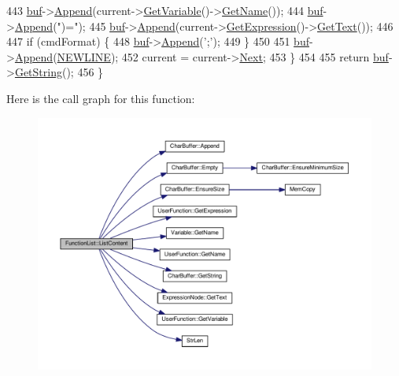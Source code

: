 \begin{DoxyCode}
443         \hyperlink{classFunctionList_aa69c3feda1c4a6133fe821982b418c39}{buf}->\hyperlink{classCharBuffer_a045b38735f7b3007c1b98d3d7b7feafe}{Append}(current->\hyperlink{classUserFunction_a4580afdaa5124951a523de07f3c454a6}{GetVariable}()->\hyperlink{classVariable_accf221d35cec8a9707e84891b715fb6c}{GetName}());
444         \hyperlink{classFunctionList_aa69c3feda1c4a6133fe821982b418c39}{buf}->\hyperlink{classCharBuffer_a045b38735f7b3007c1b98d3d7b7feafe}{Append}(\textcolor{stringliteral}{")="});
445         \hyperlink{classFunctionList_aa69c3feda1c4a6133fe821982b418c39}{buf}->\hyperlink{classCharBuffer_a045b38735f7b3007c1b98d3d7b7feafe}{Append}(current->\hyperlink{classUserFunction_a41abe1afc9d481786b78ce7d7ffbde80}{GetExpression}()->\hyperlink{classExpressionNode_a0bbf243108a14eaf963a8161ffd8eb92}{GetText}());
446 
447         \textcolor{keywordflow}{if} (cmdFormat) \{
448             \hyperlink{classFunctionList_aa69c3feda1c4a6133fe821982b418c39}{buf}->\hyperlink{classCharBuffer_a045b38735f7b3007c1b98d3d7b7feafe}{Append}(\textcolor{charliteral}{';'});
449         \}
450 
451         \hyperlink{classFunctionList_aa69c3feda1c4a6133fe821982b418c39}{buf}->\hyperlink{classCharBuffer_a045b38735f7b3007c1b98d3d7b7feafe}{Append}(\hyperlink{platform_8h_a806511f4930171733227c99101dc0606}{NEWLINE});
452         current = current->\hyperlink{classUserFunction_a5463f575d2ed50c0dbe069ec2841a5c9}{Next};
453     \}
454 
455     \textcolor{keywordflow}{return} \hyperlink{classFunctionList_aa69c3feda1c4a6133fe821982b418c39}{buf}->\hyperlink{classCharBuffer_a7dfd3feaaf80f318ba44efe15b1ec44b}{GetString}();
456 \}
\end{DoxyCode}


Here is the call graph for this function\+:\nopagebreak
\begin{figure}[H]
\begin{center}
\leavevmode
\includegraphics[width=350pt]{classFunctionList_ac87c5ecfbdfd7aa7c9c8c611b70c3a63_cgraph}
\end{center}
\end{figure}




